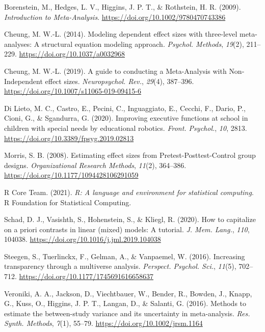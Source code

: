 \documentclass[
]{article}
\newlength{\cslhangindent}
\newlength{\cslentryspacingunit} %
\newenvironment{CSLReferences}[2] %
 {%
  \setlength{\parindent}{0pt}
  \ifodd #1
  \let\oldpar\par
  \def\par{\hangindent=\cslhangindent\oldpar}
  \fi
  \setlength{\parskip}{#2\cslentryspacingunit}
 }%
 {}
\begin{document}
\hypertarget{refs}{}
\begin{CSLReferences}{1}{0}
\leavevmode{}%
Borenstein, M., Hedges, L. V., Higgins, J. P. T., \& Rothstein, H. R. (2009). \emph{Introduction to {Meta-Analysis}}. \url{https://doi.org/10.1002/9780470743386}

\leavevmode{}%
Cheung, M. W.-L. (2014). Modeling dependent effect sizes with three-level meta-analyses: A structural equation modeling approach. \emph{Psychol. Methods}, \emph{19}(2), 211--229. \url{https://doi.org/10.1037/a0032968}

\leavevmode{}%
Cheung, M. W.-L. (2019). A guide to conducting a {Meta-Analysis} with {Non-Independent} effect sizes. \emph{Neuropsychol. Rev.}, \emph{29}(4), 387--396. \url{https://doi.org/10.1007/s11065-019-09415-6}

\leavevmode{}%
Di Lieto, M. C., Castro, E., Pecini, C., Inguaggiato, E., Cecchi, F., Dario, P., Cioni, G., \& Sgandurra, G. (2020). Improving executive functions at school in children with special needs by educational robotics. \emph{Front. Psychol.}, \emph{10}, 2813. \url{https://doi.org/10.3389/fpsyg.2019.02813}

\leavevmode{}%
Morris, S. B. (2008). Estimating effect sizes from {Pretest-Posttest-Control} group designs. \emph{Organizational Research Methods}, \emph{11}(2), 364--386. \url{https://doi.org/10.1177/1094428106291059}

\leavevmode{}%
R Core Team. (2021). \emph{R: A language and environment for statistical computing}. R Foundation for Statistical Computing.

\leavevmode{}%
Schad, D. J., Vasishth, S., Hohenstein, S., \& Kliegl, R. (2020). How to capitalize on a priori contrasts in linear (mixed) models: A tutorial. \emph{J. Mem. Lang.}, \emph{110}, 104038. \url{https://doi.org/10.1016/j.jml.2019.104038}

\leavevmode{}%
Steegen, S., Tuerlinckx, F., Gelman, A., \& Vanpaemel, W. (2016). Increasing transparency through a multiverse analysis. \emph{Perspect. Psychol. Sci.}, \emph{11}(5), 702--712. \url{https://doi.org/10.1177/1745691616658637}

\leavevmode{}%
Veroniki, A. A., Jackson, D., Viechtbauer, W., Bender, R., Bowden, J., Knapp, G., Kuss, O., Higgins, J. P. T., Langan, D., \& Salanti, G. (2016). Methods to estimate the between-study variance and its uncertainty in meta-analysis. \emph{Res. Synth. Methods}, \emph{7}(1), 55--79. \url{https://doi.org/10.1002/jrsm.1164}

\end{CSLReferences}
\end{document}
